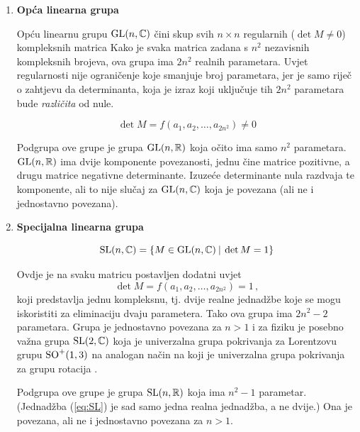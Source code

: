 \begin{enumerate}[leftmargin=0pt, itemindent=0pt]

\item \textbf{Opća linearna grupa}

Opću linearnu grupu $\mathrm{GL}(n, \mathbb{C})$ čini
skup svih $n\times n$ regularnih ($\det M \neq 0$)
kompleksnih matrica
Kako je svaka matrica zadana s $n^2$ nezavisnih kompleksnih brojeva, ova
grupa ima $2 n^2$ realnih parametara. Uvjet regularnosti nije ograničenje
koje smanjuje broj parametara, jer je samo riječ o zahtjevu da determinanta,
koja je izraz koji uključuje tih $2 n^2$ parametara bude \emph{različita} od nule.

\begin{equation}
\det M = f(a_1, a_2 , \dots, a_{2n^2}) \neq 0
\end{equation}

Podgrupa ove grupe je grupa $\mathrm{GL}(n, \mathbb{R})$ koja očito ima samo
$n^2$ parametara. $\mathrm{GL}(n, \mathbb{R})$ ima dvije komponente povezanosti,
jednu čine matrice pozitivne, a drugu matrice negativne determinante.
Izuzeće determinante nula razdvaja te komponente, ali to nije slučaj
za $\mathrm{GL}(n, \mathbb{C})$ koja je povezana (ali ne i jednostavno povezana).

\item \textbf{Specijalna linearna grupa}

\begin{equation}
\mathrm{SL}(n, \mathbb{C}) = \{ M\in \mathrm{GL}(n,\mathbb{C}) \: | \: \det M = 1\}
\end{equation}

Ovdje je na svaku matricu postavljen dodatni uvjet
\begin{equation}
\det M = f(a_1, a_2 , \dots, a_{2n^2}) = 1 \,,
\label{eq:SL}
\end{equation}
koji predstavlja jednu kompleksnu, tj. dvije realne jednadžbe koje
se mogu iskoristiti za eliminaciju dvaju parametera. Tako ova grupa
ima $2 n^2 - 2$ parametara. Grupa je jednostavno povezana za $n>1$ i za fiziku
je posebno važna grupa $\mathrm{SL}(2, \mathbb{C})$ koja je univerzalna grupa
pokrivanja za Lorentzovu grupu $\mathrm{SO}^{+}(1,3)$ na analogan način na koji je 
univerzalna grupa pokrivanja za grupu rotacija .

Podgrupa ove grupe je grupa $\mathrm{SL}(n, \mathbb{R})$ koja ima 
$n^2 - 1$ parametar. (Jednadžba (\ref{eq:SL}) je sad samo jedna
realna jednadžba, a ne dvije.) Ona je povezana, ali ne i jednostavno
povezana za $n>1$.


\end{enumerate}
